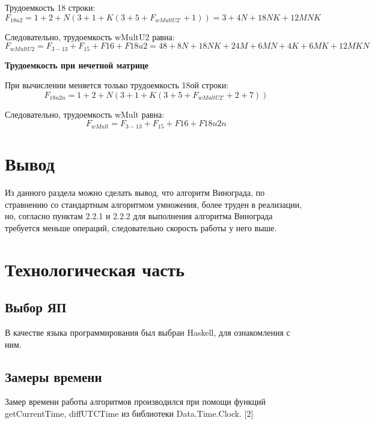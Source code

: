 \documentclass[12pt]{report}
\begin{document}
Трудоемкость 18 строки:
\begin{equation}
	F_{18u2} = 1 + 2 + N(3 + 1 + K(3 + 5 + F_{wMultU2'} + 1)) = 3 + 4N + 18NK + 12MNK
\end{equation}

Следовательно, трудоемкость wMultU2 равна:
\begin{equation}
	F_{wMultU2} = F_{3-13} + F_{15} + F{16} + F{18u2}  = 48 + 8N + 18NK + 24M + 6MN + 4K + 6MK + 12MKN
\end{equation}


\begin{center}
\textbf{Трудоемкость при нечетной матрице}
\end{center}

	При вычислении меняется только трудоемкость 18ой строки:
\begin{equation}
	F_{18u2n} = 1 + 2 + N(3 + 1 + K(3 + 5 + F_{wMultU2'} + 2 + 7))
\end{equation}

Следовательно, трудоемкость wMult равна:
\begin{equation}
	F_{wMult} = F_{3-13} + F_{15} + F{16} + F{18u2n}
\end{equation}


\chapter*{Вывод}

	Из данного раздела можно сделать вывод, что алгоритм Винограда, по стравнению со стандартным алгоритмом умножения, более труден в реализации, но, согласно пунктам 2.2.1 и 2.2.2 для выполнения алгоритма Винограда требуется меньше операций, следовательно скорость работы у него выше.

\chapter{Технологическая часть}
\section{Выбор ЯП}
В качестве языка программирования был выбран Haskell, для ознакомления с ним.

\section{Замеры времени}
Замер времени работы алгоритмов производился при помощи функций getCurrentTime, diffUTCTime из библиотеки Data.Time.Clock. [2]
\end{document}
